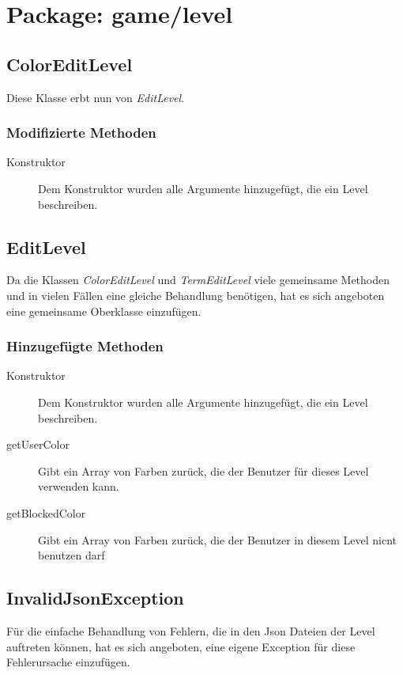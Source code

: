 \section{Package: game/level}

\subsection{ColorEditLevel}
	Diese Klasse erbt nun von \emph{EditLevel}.

	\subsubsection{Modifizierte Methoden}
		\begin{description}
			\item[Konstruktor] Dem Konstruktor wurden alle Argumente hinzugefügt, die ein Level beschreiben.
		\end{description}


\subsection{EditLevel}
	Da die Klassen \emph{ColorEditLevel} und \emph{TermEditLevel} viele gemeinsame Methoden und in vielen Fällen 
	eine gleiche Behandlung benötigen, hat es sich angeboten eine gemeinsame Oberklasse einzufügen. 

	\subsubsection{Hinzugefügte Methoden}
		\begin{description}
			\item[Konstruktor] Dem Konstruktor wurden alle Argumente hinzugefügt, die ein Level beschreiben.
			\item[getUserColor] Gibt ein Array von Farben zurück, die der Benutzer für dieses Level verwenden kann.
			\item[getBlockedColor] Gibt ein Array von Farben zurück, die der Benutzer in diesem Level nicnt benutzen 
				darf
		\end{description}


\subsection{InvalidJsonException}
	Für die einfache Behandlung von Fehlern, die in den Json Dateien der Level auftreten können, hat es sich 
	angeboten, eine eigene Exception für diese Fehlerursache einzufügen.   

